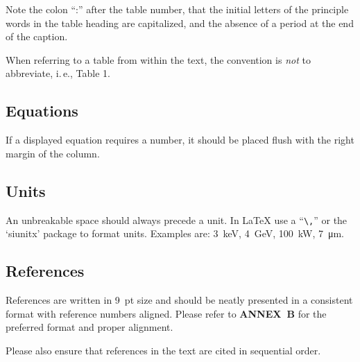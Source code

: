 Note the colon “:” after the table number, that the initial
letters of the principle words in the table heading are
capitalized, and the absence of a period at the end of the
caption.

When referring to a table from within the text, the convention
is \emph{not} to abbreviate, i.\,e., Table 1.

\subsection{Equations}

If a displayed equation requires a number, it should be
placed flush with the right margin of the column. 

\subsection{Units}

An unbreakable space should always precede a unit. In \LaTeX{} use
a “\verb|\,|” or the ‘siunitx’ package to format units.
Examples are:
\SI{3}{keV}, \SI{4}{GeV}, \SI{100}{kW}, \SI{7}{\micro m}.

\subsection{References}

References are written in \SI{9}{pt} size and should be neatly
presented in a consistent format with reference numbers
aligned. Please refer to \textbf{ANNEX~B} for the preferred format
and proper alignment.

Please also ensure that references in the text are cited in
sequential order.

\flushend
